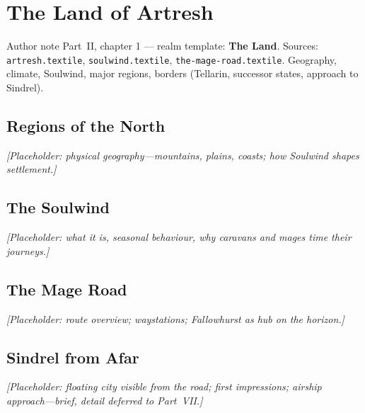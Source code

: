 \chapter{The Land of Artresh}

\begin{DndComment}{Author note}
  Part~II, chapter 1 --- realm template: \textbf{The Land}.
  Sources: \texttt{artresh.textile}, \texttt{soulwind.textile}, \texttt{the-mage-road.textile}.
  Geography, climate, Soulwind, major regions, borders (Tellarin, successor states, approach to Sindrel).
\end{DndComment}

\section{Regions of the North}

\textit{[Placeholder: physical geography---mountains, plains, coasts; how Soulwind shapes settlement.]}

\section{The Soulwind}

\textit{[Placeholder: what it is, seasonal behaviour, why caravans and mages time their journeys.]}

\section{The Mage Road}

\textit{[Placeholder: route overview; waystations; Fallowhurst as hub on the horizon.]}

\section{Sindrel from Afar}

\textit{[Placeholder: floating city visible from the road; first impressions; airship approach---brief, detail deferred to Part~VII.]}
